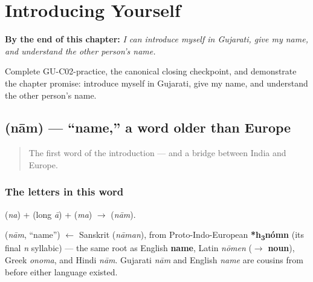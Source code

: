 
\chapter{Introducing Yourself}
\label{ch:introductions}

\begin{chapteropening}
\textbf{By the end of this chapter:} \emph{I can introduce myself in Gujarati, give my name, and understand the other person's name.}

Complete GU-C02-practice, the canonical closing checkpoint, and demonstrate the chapter promise: introduce myself in Gujarati, give my name, and understand the other person's name.
\end{chapteropening}

\section[\texorpdfstring{\gu{નામ} (nām)}{નામ (nām)}]{ (nām) — \textquotedblleft{}name,\textquotedblright{} a word older than Europe}

\label{lesson:GU-C02-naam}



\begin{quote}
The first word of the introduction — and a bridge between India and Europe.
\end{quote}

\subsection*{The letters in this word}
\textbf{} (\emph{na}) + \textbf{} (long \emph{ā}) + \textbf{} (\emph{ma}) $\to$ \textbf{} (\emph{nām}).

\begin{cousinweb}
\textbf{} (\emph{nām}, \textquotedblleft{}name\textquotedblright{}) $\leftarrow$ Sanskrit \textbf{} (\emph{nāman}), from Proto-Indo-European \textbf{*h\textsubscript{3}nómn} (its final \emph{n} syllabic) — the same root as English \textbf{name}, Latin \emph{nōmen} ($\to$ \textbf{noun}), Greek \emph{onoma}, and Hindi \emph{nām}. Gujarati \emph{nām} and English \emph{name} are cousins from before either language existed.
\end{cousinweb}

